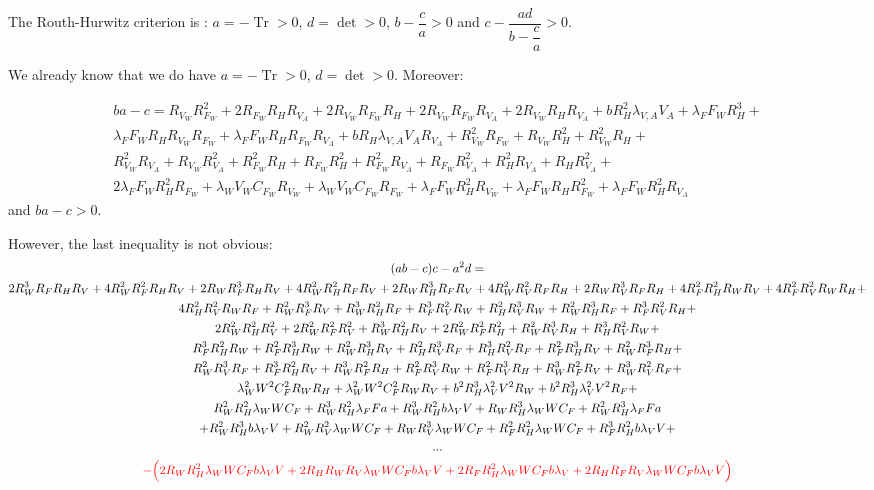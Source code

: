 \documentclass{article}
\newcommand{\lva}{\lambda_{V, A}}
\newcommand{\lfw}{\lambda_{F}}
\newcommand{\lfv}{\lambda_{W}}
\newcommand{\marc}[1]{\textcolor{red}{#1}}
\DeclareMathOperator{\Tr}{Tr}
\begin{document}
The Routh-Hurwitz criterion is : $a = -\Tr > 0$, $d = \det > 0$, $b - \dfrac{c}{a} >0 $ and $c - \dfrac{ad}{b - \dfrac{c}{a}} > 0$.

We already know that we do have $a = -\Tr > 0$, $d = \det > 0$. Moreover:

\begin{multline*}
ba - c = R_{V_W} R_{F_W}^2 + 2 R_{F_W} R_H R_{V_A} + 2 R_{V_W} R_{F_W} R_H
+ 2 R_{V_W} R_{F_W} R_{V_A} + 2 R_{V_W} R_H R_{V_A} + b R_H^2
\lva V_A + \lfw F_W R_H^3 + \\ 
\lfw F_W R_H R_{V_W} R_{F_W} + \lfw F_W R_H R_{F_W} R_{V_A} + b R_H \lva V_A R_{V_A} + R_{V_W}^2 R_{F_W} + R_{V_W} R_H^2 + R_{V_W}^2 R_H  + \\ 
R_{V_W}^2 R_{V_A} + R_{V_W} R_{V_A}^2 + R_{F_W}^2 R_H + R_{F_W}
R_H^2 + R_{F_W}^2 R_{V_A} + R_{F_W} R_{V_A}^2 + R_H^2
R_{V_A} + R_H R_{V_A}^2 + \\
2\lfw F_W R_H^2 R_{F_W} + \lfv V_W C_{F_W} R_{V_W} + \lfv V_W C_{F_W} R_{F_W} + \lfw F_W R_H^2 R_{V_W} + \lfw F_W R_H R_{F_W}^2 + \lfw
F_W R_H^2 R_{V_A}
\end{multline*}
and $b a - c > 0$.

However, the last inequality is not obvious:
\begin{multline*}
(ab-c)c - a^2 d = \\
2  R_W ^3R_FR_HR_V+4  R_W ^2 R_F ^2R_H R_V+2 R_W R_F ^3R_HR_V+4  R_W ^2 R_
H ^2R_FR_V+2 R_W R_H ^3R_FR_V+4  R_{W} ^2 R_V ^2R_FR_H+2 R_W R_V ^3R_F R_{H}+4  R_F ^2 R_H ^2R_WR_V+4  R_F ^2 R_{V} ^2R_WR_H+ \\
4  R_H ^2 R_V ^2R_WR_F+ R_W ^2 R_F ^3R_V+ R_W ^3 R_H ^2R_F+ R_{F} ^3 R_V ^2R_W+ R_H ^2 R_V ^3R_W+ R_W ^2 R_H ^3R_F+ R_F ^3 R_V ^2R_H+ \\
2  R_W ^2 R_H ^2 R_V ^2+2  R_W ^2 R_F ^2 R_V ^2+ R_W ^3 R_H ^2R_V+2  R_W ^2 R_F ^2R_H ^2+ R_W ^2 R_V ^3R_H+ R_H ^3 R_V ^2R_W+ \\
R_F ^3 R_H ^2R_W+ R_F ^2 R_H ^{3}R_W+ R_W ^2 R_H ^3R_V+ R_H ^2 R_V ^3R_F+ R_H ^3 R_V ^2R_F+ R_F ^2 R_H ^3R_V+ R_W ^2 R_F ^3R_H+ \\
R_W ^2 R_V ^3R_{F}+ R_F ^3 R_H ^2R_V+ R_W ^3 R_F ^2R_H+ R_F ^2 R_V ^3R_W+ R_F ^2 R_V ^3R_H+R_W ^3 R_F ^2R_V+ R_W ^3 R_V ^2R_F+ \\
\lambda_W ^2W ^2C_F ^2R_WR_H+\lambda_W ^{2}W ^2C_F ^2R_WR_V+b ^2 R_H ^3\lambda_V ^2V ^2R_W+b ^2 R_H ^3\lambda_V ^2V ^2R_F+ \\
R_W ^2 R_H ^2\lambda_WWC_F+ R_W ^3 R_H ^2\lambda_FFa+ R_W ^3 R_H ^2b\lambda_VV+R_W R_H ^3\lambda_WWC_F+ R_W ^2 R_H ^3\lambda_FFa \\
+ R_W ^2 R_H ^3b\lambda_VV+ R_W ^{2} R_V ^2\lambda_WWC_F+R_W R_V ^3\lambda_WWC_F+ R_F ^2 R_H ^2\lambda_WWC_F+ R_F ^3R_H ^2b\lambda_VV+ \\
... \\
\marc{- \Big( 2 R_W R_H ^2\lambda_WWC_Fb\lambda_{V}V +2 R_HR_WR_V\lambda_WWC_Fb\lambda_VV +2 R
_F R_H ^2\lambda_WWC_Fb\lambda_V + 2 R_HR_{F}R_V\lambda_WWC_Fb\lambda_VV \Big)}
\end{multline*}
\end{document}
